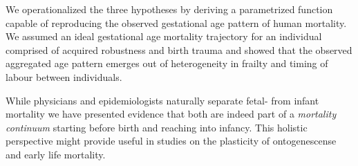 \documentclass[12pt, parskip=half]{scrartcl}
\begin{document}
We operationalized the three hypotheses by deriving a parametrized function capable of reproducing the observed gestational age pattern of human mortality. We assumed an ideal gestational age mortality trajectory for an individual comprised of acquired robustness and birth trauma and showed that the observed aggregated age pattern emerges out of heterogeneity in frailty and timing of labour between individuals.

While physicians and epidemiologists naturally separate fetal- from infant mortality we have presented evidence that both are indeed part of a \emph{mortality continuum} starting before birth and reaching into infancy. This holistic perspective might provide useful in studies on the plasticity of ontogenescense and early life mortality.

\clearpage


\sloppy
\printbibliography



\end{document}
